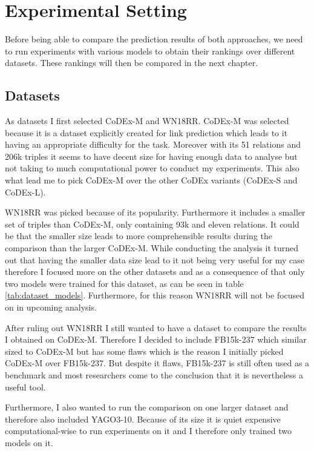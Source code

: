 \chapter{Experimental Setting}
\label{cha:experiment_setting}

Before being able to compare the prediction results of both approaches, we need to run experiments with various models to obtain their rankings over different datasets. These rankings will then be compared in the next chapter.

\section{Datasets}
\label{sec:experiment_datasets}
As datasets I first selected CoDEx-M and WN18RR. CoDEx-M was selected because it is a dataset explicitly created for link prediction which leads to it having an appropriate difficulty for the task. Moreover with its 51 relations and 206k triples it seems to have decent size for having enough data to analyse but not taking to much computational power to conduct my experiments. This also what lead me to pick CoDEx-M over the other CoDEx variants (CoDEx-S and CoDEx-L). 

WN18RR was picked because of its popularity. Furthermore it includes a smaller set of triples than CoDEx-M, only containing 93k and eleven relations. It could be that the smaller size leads to more comprehensible results during the comparison than the larger CoDEx-M. While conducting the analysis it turned out that having the smaller data size lead to it not being very useful for my case therefore I focused more on the other datasets and as a consequence of that only two models were trained for this dataset, as can be seen in table \ref{tab:dataset_models}. Furthermore, for this reason WN18RR will not be focused on in upcoming analysis.

After ruling out WN18RR I still wanted to have a dataset to compare the results I obtained on CoDEx-M. Therefore I decided to include FB15k-237 which similar sized to CoDEx-M but has some flaws which is the reason I initially picked CoDEx-M over FB15k-237. But despite it flaws, FB15k-237 is still often used as a benchmark and most researchers come to the conclusion that it is nevertheless a useful tool. 

Furthermore, I also wanted to run the comparison on one larger dataset and therefore also included YAGO3-10. Because of its size it is quiet expensive computational-wise to run experiments on it and I therefore only trained two models on it.

